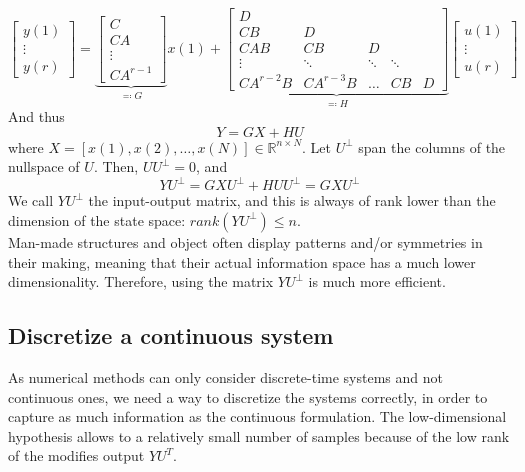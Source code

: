 \documentclass[12pt, openany]{report}
\newcommand{\R}{\mathbb{R}}
\theoremstyle{definition}
\begin{document}
\begin{equation}
	\begin{bmatrix}
	y(1) \\\vdots \\ y(r)
	\end{bmatrix} = \underbrace{\begin{bmatrix} C\\ CA\\\vdots \\ CA^{r-1}\end{bmatrix}}_{\eqqcolon G}x(1) + \underbrace{\begin{bmatrix}
		D &&&&\\
		CB & D &&&\\
		CAB & CB & D && \\
		\vdots & \ddots & \ddots & \ddots & \\
		CA^{r-2}B & CA^{r-3}B & \dots & CB & D
	\end{bmatrix}}_{\eqqcolon H} \begin{bmatrix}
		u(1) \\ \vdots \\u(r)
	\end{bmatrix}
\end{equation}
And thus 
\begin{equation}
	Y = GX+HU
\end{equation}
where $X=[x(1), x(2),\dots,x(N)]\in \R^{n\times N}$. Let $U^\perp$ span the columns of the nullspace of $U$. Then, $UU^\perp=0$, and 
\begin{equation}
	YU^\perp = GXU^\perp + HUU^\perp = GXU^\perp
\end{equation}
We call $YU^\perp$ the input-output matrix, and this is always of rank lower than the dimension of the state space: $rank(YU^\perp)\le n$. \\
Man-made structures and object often display patterns and/or symmetries in their making, meaning that their actual information space has a much lower dimensionality. Therefore, using the matrix $YU^\perp$ is much more efficient. 
\subsection{Discretize a continuous system}
As numerical methods can only consider discrete-time systems and not continuous ones, we need a way to discretize the systems correctly, in order to capture as much information as the continuous formulation. The low-dimensional hypothesis allows to a relatively small number of samples because of the low rank of the modifies output $YU^T$. 
\end{document}
